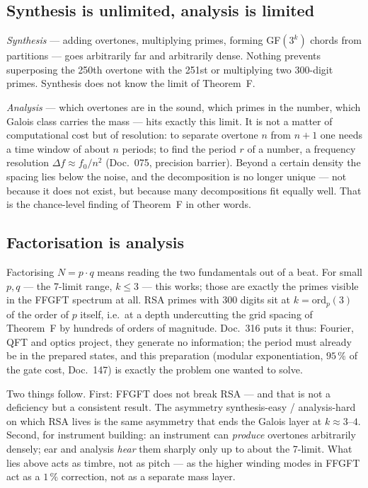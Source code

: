 \subsection{Synthesis is unlimited, analysis is limited}

\emph{Synthesis} --- adding overtones, multiplying primes, forming
GF$(3^k)$ chords from partitions --- goes arbitrarily far and arbitrarily
dense. Nothing prevents superposing the 250th overtone with the 251st or
multiplying two 300-digit primes. Synthesis does not know the limit of
Theorem~F.

\emph{Analysis} --- which overtones are in the sound, which primes in the
number, which Galois class carries the mass --- hits exactly this limit. It
is not a matter of computational cost but of resolution: to separate overtone
$n$ from $n{+}1$ one needs a time window of about $n$ periods; to find the
period $r$ of a number, a frequency resolution $\Delta f \approx f_0/n^2$
(Doc.~075, precision barrier). Beyond a certain density the spacing lies
below the noise, and the decomposition is no longer unique --- not because it
does not exist, but because many decompositions fit equally well. That is the
chance-level finding of Theorem~F in other words.

\subsection{Factorisation is analysis}

Factorising $N = p \cdot q$ means reading the two fundamentals out of a beat.
For small $p, q$ --- the 7-limit range, $k \leq 3$ --- this works; those are
exactly the primes visible in the FFGFT spectrum at all. RSA primes with 300
digits sit at $k = \mathrm{ord}_p(3)$ of the order of $p$ itself, i.e.\ at a
depth undercutting the grid spacing of Theorem~F by hundreds of orders of
magnitude. Doc.~316 puts it thus: Fourier, QFT and optics project, they
generate no information; the period must already be in the prepared states,
and this preparation (modular exponentiation, $95\,\%$ of the gate cost,
Doc.~147) is exactly the problem one wanted to solve.

Two things follow. First: FFGFT does not break RSA --- and that is not a
deficiency but a consistent result. The asymmetry synthesis-easy /
analysis-hard on which RSA lives is the same asymmetry that ends the Galois
layer at $k \approx 3$--$4$. Second, for instrument building: an instrument can
\emph{produce} overtones arbitrarily densely; ear and analysis \emph{hear}
them sharply only up to about the 7-limit. What lies above acts as timbre,
not as pitch --- as the higher winding modes in FFGFT act as a $1\,\%$
correction, not as a separate mass layer.

